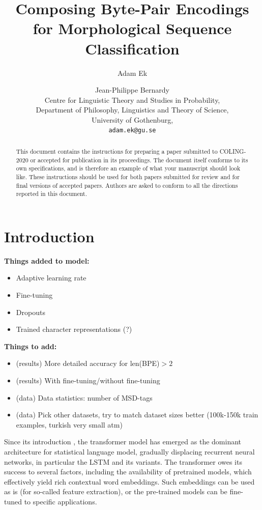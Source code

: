 \documentclass[11pt]{article}
\title{Composing Byte-Pair Encodings for Morphological Sequence Classification}
\author{Adam Ek \and Jean-Philippe Bernardy\\
	Centre for Linguistic Theory and Studies in Probability,\\
	Department of Philosophy, Linguistics and Theory of Science,\\
	University of Gothenburg,\\
	\texttt{adam.ek@gu.se}}
\date{}
\begin{document}
	\maketitle
	
	\begin{abstract}
		This document contains the instructions for preparing a paper submitted
		to COLING-2020 or accepted for publication in its proceedings. The document itself
		conforms to its own specifications, and is therefore an example of
		what your manuscript should look like. These instructions should be
		used for both papers submitted for review and for final versions of
		accepted papers. Authors are asked to conform to all the directions
		reported in this document.
	\end{abstract}
	
	\section{Introduction}
	\label{intro}
	
	\textbf{Things added to model:}
	\begin{itemize}
		\item Adaptive learning rate
		\item Fine-tuning
		\item Dropouts
		\item Trained character representations (?)
	\end{itemize}
	
	\textbf{Things to add:}
	\begin{itemize}
		\item (results) More detailed accuracy for len(BPE)$>2$
		\item (results) With fine-tuning/without fine-tuning
		\item (data) Data statistics: number of MSD-tags 
		\item (data) Pick other datasets, try to match dataset sizes better (100k-150k train examples, turkish very small atm)
	\end{itemize}

        Since its introduction \cite{todo}, the transformer model has
        emerged as the dominant architecture for statistical language
        model, gradually displacing recurrent neural networks, in
        particular the LSTM and its variants. The transformer owes its
        success to several factors, including the availability of
        pretrained models, which effectively yield rich contextual
        word embeddings. Such embeddings can be used as is (for
        so-called feature extraction), or the pre-trained models can
        be fine-tuned to specific applications.
\end{document}
